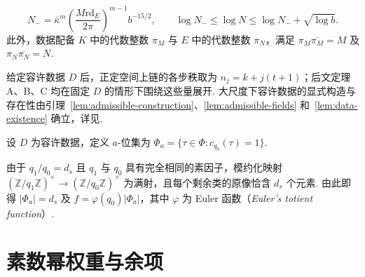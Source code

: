 \begin{definition}[容许数据]
\begin{itemize}
\[
 N_-=\bar\kappa^m\left(\frac{M\mathrm{rd}_E}{2\pi}\right)^{m-1}b^{-15/2},
 \qquad \log N_-\le\log N\le\log N_-+\sqrt{\log b}.
\]
此外，数据配备 $K$ 中的代数整数 $\pi_M$ 与 $E$ 中的代数整数 $\pi_N$，满足
$\pi_M\overline{\pi_M}=M$ 及 $\pi_N\overline{\pi_N}=N$.
\end{itemize}
\end{definition}

给定容许数据 $D$ 后，正定空间上链的各步秩取为 $n_j=k+j(t+1)$；后文定理 A、B、C 均在固定 $D$ 的情形下围绕这些量展开. 大尺度下容许数据的显式构造与存在性由引理~\ref{lem:admissible-construction}、\ref{lem:admissible-fields} 和~\ref{lem:data-existence} 确立，详见.

\begin{definition}[$a$-位]
\label{def:a-places}
\emitthmsource
设 $D$ 为容许数据，定义 $a$-位集为 $\Phi_a=\{\tau\in\Phi:c_{q_0}(\tau)=1\}$.
\end{definition}

由于 $q_1/q_0=d_s$ 且 $q_1$ 与 $q_0$ 具有完全相同的素因子，模约化映射 $(\mathbb Z/q_1\mathbb Z)^\times\to(\mathbb Z/q_0\mathbb Z)^\times$ 为满射，且每个剩余类的原像恰含 $d_s$ 个元素. 由此即得 $|\Phi_a|=d_s$ 及 $f=\varphi(q_0)|\Phi_a|$，其中 $\varphi$ 为 Euler 函数（\emph{Euler's totient function}）.

\section{素数幂权重与余项}
\label{sec:prime-remainders}


